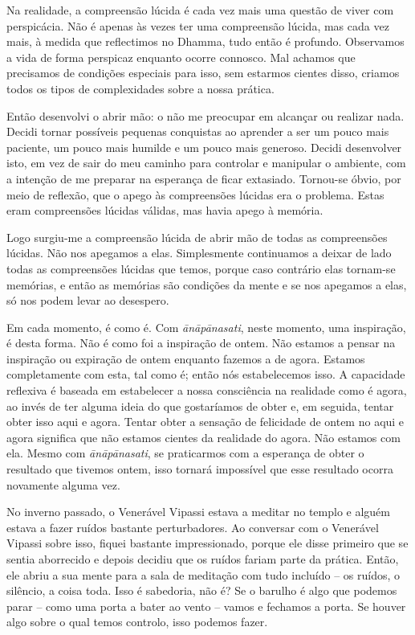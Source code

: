 Na realidade, a compreensão lúcida é cada vez mais uma questão de viver com
perspicácia. Não é apenas às vezes ter uma compreensão lúcida, mas cada vez
mais, à medida que reflectimos no Dhamma, tudo então é profundo. Observamos a
vida de forma perspicaz enquanto ocorre connosco. Mal achamos que precisamos de
condições especiais para isso, sem estarmos cientes disso, criamos todos os
tipos de complexidades sobre a nossa prática.

Então desenvolvi o abrir mão: o não me preocupar em alcançar ou realizar nada.
Decidi tornar possíveis pequenas conquistas ao aprender a ser um pouco mais
paciente, um pouco mais humilde e um pouco mais generoso. Decidi desenvolver
isto, em vez de sair do meu caminho para controlar e manipular o ambiente, com a
intenção de me preparar na esperança de ficar extasiado. Tornou-se óbvio, por
meio de reflexão, que o apego às compreensões lúcidas era o problema. Estas eram
compreensões lúcidas válidas, mas havia apego à memória.

Logo surgiu-me a compreensão lúcida de abrir mão de todas as compreensões
lúcidas. Não nos apegamos a elas. Simplesmente continuamos a deixar de lado
todas as compreensões lúcidas que temos, porque caso contrário elas tornam-se
memórias, e então as memórias são condições da mente e se nos apegamos a elas,
só nos podem levar ao desespero.

Em cada momento, é como é. Com \emph{ānāpānasati}, neste momento, uma
inspiração, é desta forma. Não é como foi a inspiração de ontem. Não estamos a
pensar na inspiração ou expiração de ontem enquanto fazemos a de agora. Estamos
completamente com esta, tal como é; então nós estabelecemos isso. A capacidade
reflexiva é baseada em estabelecer a nossa consciência na realidade como é
agora, ao invés de ter alguma ideia do que gostaríamos de obter e, em seguida,
tentar obter isso aqui e agora. Tentar obter a sensação de felicidade de ontem
no aqui e agora significa que não estamos cientes da realidade do agora. Não
estamos com ela. Mesmo com \emph{ānāpānasati}, se praticarmos com a esperança de obter
o resultado que tivemos ontem, isso tornará impossível que esse resultado ocorra
novamente alguma vez.

No inverno passado, o Venerável Vipassi estava a meditar no templo e alguém
estava a fazer ruídos bastante perturbadores. Ao conversar com o Venerável
Vipassi sobre isso, fiquei bastante impressionado, porque ele disse primeiro que
se sentia aborrecido e depois decidiu que os ruídos fariam parte da prática.
Então, ele abriu a sua mente para a sala de meditação com tudo incluído -- os
ruídos, o silêncio, a coisa toda. Isso é sabedoria, não é? Se o barulho é algo
que podemos parar -- como uma porta a bater ao vento -- vamos e fechamos a
porta. Se houver algo sobre o qual temos controlo, isso podemos fazer.


